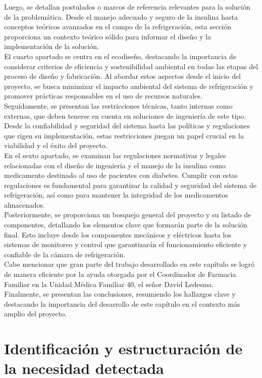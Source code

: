 Luego, se detallan postulados o marcos de referencia relevantes para la solución de la problemática. Desde el manejo adecuado y seguro de la insulina hasta conceptos teóricos avanzados en el campo de la refrigeración, esta sección proporciona un contexto teórico sólido para informar el diseño y la implementación de la solución.\\
El cuarto apartado se centra en el ecodiseño, destacando la importancia de considerar criterios de eficiencia y sostenibilidad ambiental en todas las etapas del proceso de diseño y fabricación. Al abordar estos aspectos desde el inicio del proyecto, se busca minimizar el impacto ambiental del sistema de refrigeración y promover prácticas responsables en el uso de recursos naturales.\\
Seguidamente, se presentan las restricciones técnicas, tanto internas como externas, que deben tenerse en cuenta en soluciones de ingeniería de este tipo. Desde la confiabilidad y seguridad del sistema hasta las políticas y regulaciones que rigen su implementación, estas restricciones juegan un papel crucial en la viabilidad y el éxito del proyecto.\\
En el sexto apartado, se examinan las regulaciones normativas y legales relacionadas con el diseño de ingeniería y el manejo de la insulina como medicamento destinado al uso de pacientes con diabetes. Cumplir con estas regulaciones es fundamental para garantizar la calidad y seguridad del sistema de refrigeración, así como para mantener la integridad de los medicamentos almacenados.\\
Posteriormente, se proporciona un bosquejo general del proyecto y su listado de componentes, detallando los elementos clave que formarán parte de la solución final. Esto incluye desde los componentes mecánicos y eléctricos hasta los sistemas de monitoreo y control que garantizarán el funcionamiento eficiente y confiable de la cámara de refrigeración.\\
Cabe mencionar que gran parte del trabajo desarrollado en este capítulo se logró de manera eficiente por la ayuda otorgada por el Coordinador de Farmacia Familiar en la Unidad Médica Familiar 40, el señor David Ledesma.\\
Finalmente, se presentan las conclusiones, resumiendo los hallazgos clave y destacando la importancia del desarrollo de este capítulo en el contexto más amplio del proyecto. \rsp
\section{Identificación y estructuración de la necesidad detectada}\rsp

